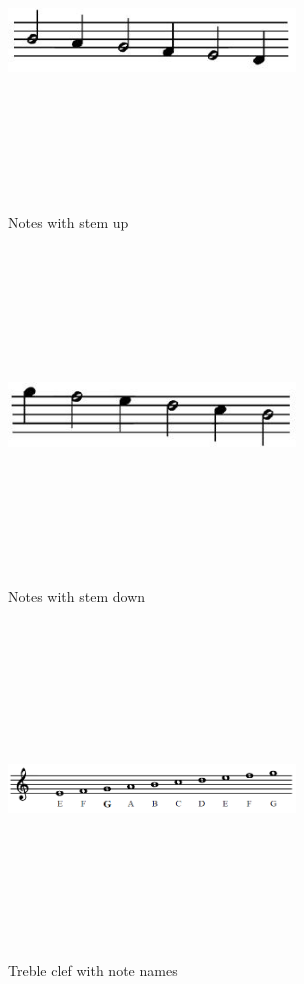 \documentclass[journal]{IEEEtran}
\begin{document}
\begin{figure}
\includegraphics[width=3in,height=3.5in,clip,keepaspectratio]{resources/images/stemp_up_notes}
\centering
\caption{Notes with stem up}
\end{figure}

\begin{figure}
\includegraphics[width=3in,height=3.5in,clip,keepaspectratio]{resources/images/stemp_down_notes}
\centering
\caption{Notes with stem down}
\end{figure}

\begin{figure}
\includegraphics[width=3in,height=3.5in,clip,keepaspectratio]{resources/images/treble_cleff}
\centering
\caption{Treble clef with note names}
\end{figure}
\end{document}
